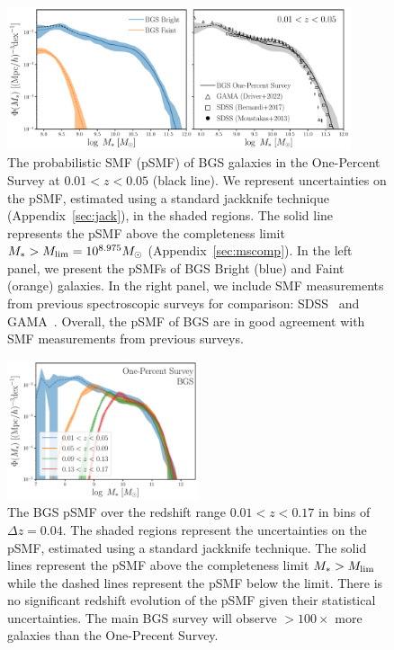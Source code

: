 \begin{figure}
\begin{center}
    \includegraphics[width=0.9\textwidth]{figs/psmf_bgs_any_comp.pdf} 
    \caption{
        The probabilistic SMF (pSMF) of BGS galaxies in the One-Percent Survey
        at $0.01 < z < 0.05$ (black line). 
        We represent uncertainties on the pSMF, estimated using a standard
        jackknife technique (Appendix~\ref{sec:jack}), in the shaded regions.
        The solid line represents the pSMF above the completeness limit 
        $M_* > M_{\rm lim} = 10^{8.975}M_\odot$ (Appendix~\ref{sec:mscomp}).
        In the left panel, we present the pSMFs of BGS Bright (blue) and
        Faint (orange) galaxies. 
        In the right panel, we include SMF measurements from previous
        spectroscopic surveys for comparison: SDSS~\citep{moustakas2013,
        bernardi2017} and GAMA~\citep{driver2022}. 
        Overall, the pSMF of BGS are in good agreement with SMF
        measurements from previous surveys.  
    }\label{fig:psmf}
\end{center}
\end{figure}

\begin{figure}
\begin{center}
    \includegraphics[width=0.5\textwidth]{figs/psmf_bgs_any_zevo.pdf} 
    \caption{
        The BGS pSMF over the redshift range $0.01 < z < 0.17$ in bins of
        $\Delta z = 0.04$. 
        The shaded regions represent the uncertainties on the pSMF, estimated
        using a standard jackknife technique.
        The solid lines represent the pSMF above the completeness limit 
        $M_* > M_{\rm lim}$ while the dashed lines represent the pSMF below
        the limit.
        There is no significant redshift evolution of the pSMF given their
        statistical uncertainties. 
        The main BGS survey will observe $>100\times$ more galaxies than the
        One-Precent Survey. 
    }\label{fig:psmfz}
\end{center}
\end{figure}

